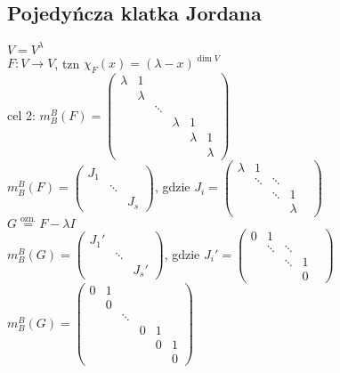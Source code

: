 \documentclass[10pt]{article}
\theoremstyle{definition}
\theoremstyle{definition}
\theoremstyle{definition}
\theoremstyle{definition}
\theoremstyle{remark}
\theoremstyle{definition}
\theoremstyle{definition}
\theoremstyle{definition}
\theoremstyle{definition}
\theoremstyle{definition}
\begin{document}
\subsection{Pojedyńcza klatka Jordana} 
$V = V^\lambda$ \\ 
$F: V \to V$, tzn $\chi_F (x) = (\lambda-x)^{\dim V}$ \\
cel 2: 
$m_B^B (F) = \begin{pmatrix} \lambda & 1 & & & & \\ 
                                     & \lambda & & & & \\
                                     & & \ddots & & & \\ 
                                     & & & \lambda & 1 & \\ 
                                     & & & & \lambda & 1 \\
                                     & & & & & \lambda
                                    \end{pmatrix} $ \\ 
$m_B^B (F) = \begin{pmatrix} J_1 & & \\ & \ddots & \\ & & J_s \end{pmatrix}$, gdzie
$J_i = \begin{pmatrix} \lambda & 1 & & & \\ & \ddots & \ddots & & \\ 
        & & \ddots & 1 \\ & & &  \lambda \end{pmatrix}$ \\ 
$G \overset{\text{ozn.}}{=} F - \lambda I$ \\ 
$m_B^B (G) = \begin{pmatrix} J_1 ' & & \\ & \ddots & \\ & & J_s' \end{pmatrix}$, gdzie
$J_i' = \begin{pmatrix} 0 & 1 & & & \\ & \ddots & \ddots & & \\ 
            & & \ddots & 1 \\ & & &  0 \end{pmatrix}$ \\ 
$m_B^B (G) = \begin{pmatrix} 0 & 1 & & & & \\ 
                                     & 0 & & & & \\
                                     & & \ddots & & & \\ 
                                     & & & 0 & 1 & \\ 
                                     & & & & 0 & 1 \\
                                     & & & & & 0
                                    \end{pmatrix} $ \\
\end{document}
